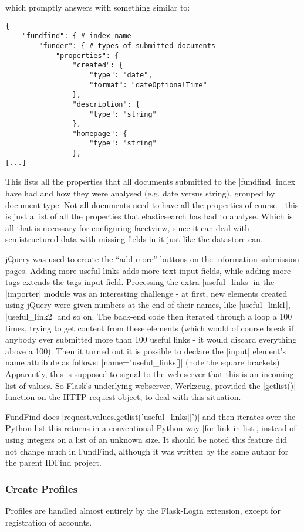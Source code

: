which promptly answers with something similar to:
\begin{verbatim}
{
	"fundfind": { # index name
		"funder": { # types of submitted documents
			"properties": {
				"created": {
					"type": "date",
					"format": "dateOptionalTime"
				},
				"description": {
					"type": "string"
				},
				"homepage": {
					"type": "string"
				},
[...]
\end{verbatim}

This lists all the properties that all documents submitted to the |fundfind| index have had and how they were analysed (e.g. date versus string), grouped by document type. Not all documents need to have all the properties of course - this is just a list of all the properties that elasticsearch has had to analyse. Which is all that is necessary for configuring facetview, since it can deal with semistructured data with missing fields in it just like the datastore can.

jQuery was used to create the ``add more'' buttons on the information submission pages. Adding more useful links adds more text input fields, while adding more tags extends the tags input field. Processing the extra |useful_links| in the |importer| module was an interesting challenge - at first, new elements created using jQuery were given numbers at the end of their names, like |useful_link1|, |useful_link2| and so on. The back-end code then iterated through a loop a 100 times, trying to get content from these elements (which would of course break if anybody ever submitted more than 100 useful links - it would discard everything above a 100). Then it turned out it is possible to declare the |input| element's name attribute as follows: |name="useful_links[]| (note the square brackets). Apparently, this is supposed to signal to the web server that this is an incoming list of values. So Flask's underlying webserver, Werkzeug, provided the |getlist()| function on the HTTP request object, to deal with this 
situation.

FundFind does |request.values.getlist('useful_links[]')| and then iterates over the Python list this returns in a conventional Python way |for link in list|, instead of using integers on a list of an unknown size. It should be noted this feature did not change much in FundFind, although it was written by the same author for the parent IDFind project.

\subsubsection{Create Profiles}
\label{impl-profiles}
Profiles are handled almost entirely by the Flask-Login extension, except for registration of accounts. \cite{flask-login}

